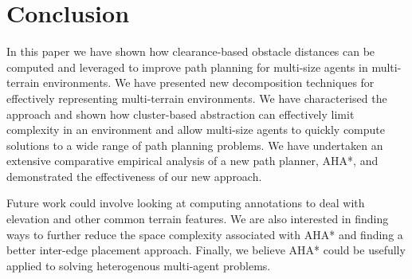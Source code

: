 \section{Conclusion}
In this paper we have shown how clearance-based obstacle distances can be computed and leveraged to improve path planning for multi-size agents in multi-terrain environments. 
We have presented new decomposition techniques for effectively representing multi-terrain environments.
We have characterised the approach and shown how cluster-based abstraction can effectively limit complexity in an environment and allow multi-size agents to quickly compute solutions to a wide range of path planning problems. 
We have undertaken an extensive comparative empirical analysis of a new path planner, AHA*, and demonstrated the effectiveness of our new approach. 
\par \indent
Future work could involve looking at computing annotations to deal with elevation and other common terrain features. We are also interested in finding ways to further reduce the space complexity associated with AHA* and finding a better inter-edge placement approach. Finally, we believe AHA* could be usefully applied to solving heterogenous multi-agent problems.
